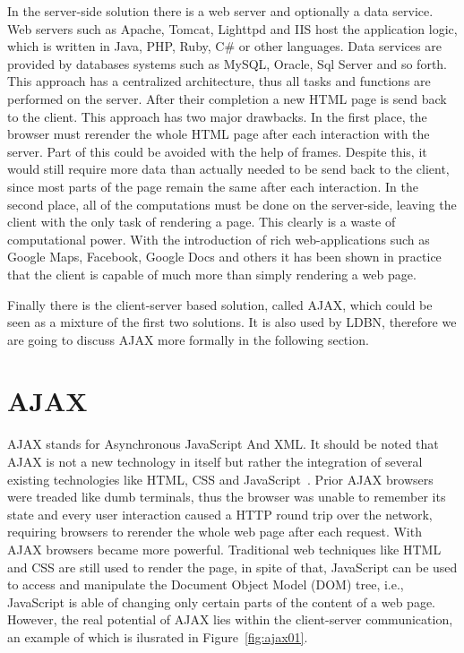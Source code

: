 In the server-side solution there is a web server and optionally a data service. 
Web servers such as Apache, Tomcat, Lighttpd and IIS host the application 
logic, which is written in Java, PHP, Ruby, C\# or other languages. 
Data services are provided by databases systems such as MySQL, Oracle, Sql Server and 
so forth. This approach has a centralized architecture, thus all tasks and 
functions are performed on the server. After their completion a new HTML page is 
send back to the client. This approach has two major drawbacks. In the first place, 
the browser must rerender the whole HTML page after each interaction with the server.
Part of this could be avoided with the help of frames. Despite this, it would still 
require more data than actually needed to be send back to the client, since most 
parts of the page remain the same after each interaction. In the second place, 
all of the computations must be done on the server-side, leaving the client with 
the only task of rendering a page. This clearly is a waste of computational power. 
With the introduction of rich web-applications such as Google Maps, Facebook, 
Google Docs and others it has been shown in practice that the client is capable of 
much more than simply rendering a web page. 

Finally there is the client-server based solution, called AJAX, which could be
seen as a mixture 
of the first two solutions. It is also used by LDBN, therefore we are going to
discuss AJAX more formally in the following section.

\section{AJAX}
\label{sec:ajax}
AJAX stands for Asynchronous JavaScript And XML. It should be noted
that AJAX is not a new technology in itself but rather the integration of several 
existing technologies like HTML, CSS and JavaScript~\cite{w3}. Prior AJAX browsers 
were treaded 
like dumb terminals, thus the browser was unable to remember its state and every 
user interaction caused a HTTP round trip over the network, requiring browsers 
to rerender the whole web page after each request. With AJAX browsers became 
more powerful. Traditional web techniques like HTML and CSS are still used to 
render the page, in spite of that, JavaScript can be used to access 
and manipulate the Document Object Model (DOM) tree, i.e., 
JavaScript is able of changing only certain parts
of the content of a web page. However, the
real potential of AJAX lies within the client-server communication, an example
of which is ilusrated in Figure~\ref{fig:ajax01}.  

